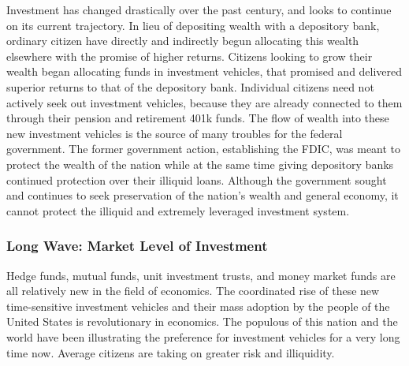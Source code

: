 Investment has changed drastically over the past century, and looks to continue on its current trajectory.  In lieu of depositing wealth with a depository bank, ordinary citizen have directly and indirectly begun allocating this wealth elsewhere with the promise of higher returns.  Citizens looking to grow their wealth began allocating funds in investment vehicles, that promised and delivered superior returns to that of the depository bank.  Individual citizens need not actively seek out investment vehicles, because they are already connected to them through their pension and retirement 401k funds.  The flow of wealth into these new investment vehicles is the source of many troubles for the federal government.  The former government action, establishing the FDIC, was meant to protect the wealth of the nation while at the same time giving depository banks continued protection over their illiquid loans.  Although the government sought and continues to seek preservation of the nation's wealth and general economy, it cannot protect the illiquid and extremely leveraged investment system.

\subsubsection{Long Wave: Market Level of Investment}  
Hedge funds, mutual funds, unit investment trusts, and money market funds are all relatively new in the field of economics.  The coordinated rise of these new time-sensitive investment vehicles and their mass adoption by the people of the United States is revolutionary in economics.  The populous of this nation and the world have been illustrating the preference for investment vehicles for a very long time now.  Average citizens are taking on greater risk and illiquidity. 

